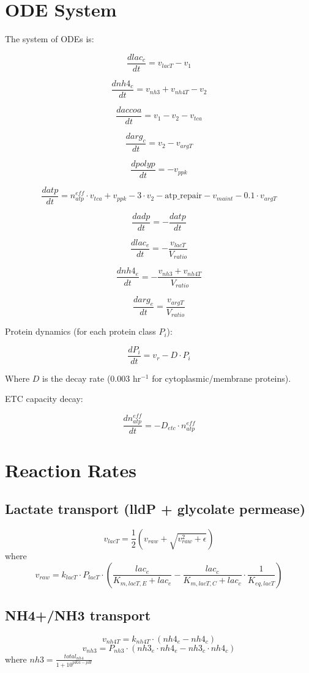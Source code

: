 \documentclass{article}
\begin{document}
\section{ODE System}

The system of ODEs is:

\[
\frac{d lac_c}{dt} = v_{lacT} - v_1
\]

\[
\frac{d nh4_c}{dt} = v_{nh3} + v_{nh4T} - v_2
\]

\[
\frac{d accoa}{dt} = v_1 - v_2 - v_{tca}
\]

\[
\frac{d arg_c}{dt} = v_2 - v_{argT}
\]

\[
\frac{d polyp}{dt} = -v_{ppk}
\]

\[
\frac{d atp}{dt} = n_{atp}^{eff} \cdot v_{tca} + v_{ppk} - 3 \cdot v_2 - \text{atp\_repair} - v_{maint} - 0.1 \cdot v_{argT}
\]

\[
\frac{d adp}{dt} = -\frac{d atp}{dt}
\]

\[
\frac{d lac_e}{dt} = -\frac{v_{lacT}}{V_{ratio}}
\]

\[
\frac{d nh4_e}{dt} = -\frac{v_{nh3} + v_{nh4T}}{V_{ratio}}
\]

\[
\frac{d arg_e}{dt} = \frac{v_{argT}}{V_{ratio}}
\]

Protein dynamics (for each protein class $P_i$):

\[
\frac{d P_i}{dt} = v_r - D \cdot P_i
\]

Where $D$ is the decay rate (0.003 hr$^{-1}$ for cytoplasmic/membrane proteins).

ETC capacity decay:

\[
\frac{d n_{atp}^{eff}}{dt} = -D_{etc} \cdot n_{atp}^{eff}
\]

\section{Reaction Rates}

\subsection{Lactate transport (lldP + glycolate permease)}
\[
v_{lacT} = \frac{1}{2} \left( v_{raw} + \sqrt{v_{raw}^2 + \epsilon} \right)
\]
where
\[
v_{raw} = k_{lacT} \cdot P_{lacT} \cdot \left( \frac{lac_e}{K_{m,lacT,E} + lac_e} - \frac{lac_c}{K_{m,lacT,C} + lac_c} \cdot \frac{1}{K_{eq,lacT}} \right)
\]

\subsection{NH4+/NH3 transport}
\[
v_{nh4T} = k_{nh4T} \cdot (nh4_e - nh4_c)
\]
\[
v_{nh3} = P_{nh3} \cdot (nh3_e \cdot nh4_e - nh3_c \cdot nh4_c)
\]
where $nh3 = \frac{total_{nh4}}{1 + 10^{pKa - pH}}$
\end{document}
